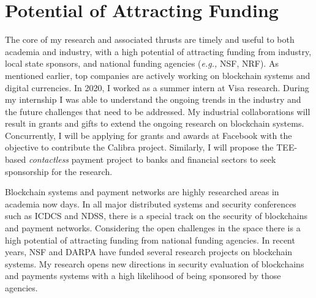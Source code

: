 \documentclass{NSF}
\newcommand{\etc}{{etc.}\xspace}
\newcommand{\eg}{{\em e.g.,}\xspace}
\begin{document}
\section{Potential of Attracting Funding}\vspace{-1mm}
The core of my research and associated thrusts are timely and useful to both academia and industry, with a high potential of attracting funding from industry, local state sponsors, and national funding agencies (\eg NSF, NRF). As mentioned earlier, top companies are actively working on blockchain systems and digital currencies. In 2020, I worked as a summer intern at Visa research. During my internship I was able to understand the ongoing trends in the industry and the future challenges that need to be addressed. My industrial collaborations will result in grants and gifts to extend the ongoing research on blockchain systems. Concurrently, I will be applying for grants and awards at Facebook with the objective to contribute the Calibra project. Similarly, I will propose the TEE-based {\em contactless} payment project to banks and financial sectors to seek sponsorship for the research. 

Blockchain systems and payment networks are highly researched areas in academia now days. In all major distributed systems and security conferences such as ICDCS and NDSS, there is a special track on the security of blockchains and payment networks. Considering the open challenges in the space there is a high potential of attracting funding from national funding agencies. In recent years, NSF and DARPA have funded several research projects on blockchain systems. My research opens new directions in security evaluation of blockchains and payments systems with a high likelihood of being sponsored by those agencies. 


\end{document}

